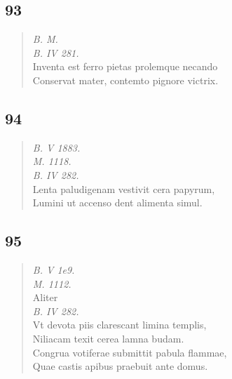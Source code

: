 \documentclass[11pt, a4paper]{report}
\begin{document}
            \subsection*{93}
      \begin{verse}
      \textit{B. M.} \\ \textit{B. IV 281.} \\ Inventa est ferro pietas prolemque necando \\ Conservat mater, contemto pignore victrix. \\ 
      \end{verse}
  
            \subsection*{94}
      \begin{verse}
      \textit{B. V 1883.} \\ \textit{M. 1118.} \\ \textit{B. IV 282.} \\ Lenta paludigenam vestivit cera papyrum, \\ Lumini ut accenso dent alimenta simul. \\ 
      \end{verse}
  
            \subsection*{95}
      \begin{verse}
      \textit{B. V 1e9.} \\ \textit{M. 1112.} \\ Aliter \\ \textit{B. IV 282.} \\ Vt devota piis clarescant limina templis, \\ Niliacam texit cerea lamna budam. \\ Congrua votiferae submittit pabula flammae, \\ Quae castis apibus praebuit ante domus. \\ 
      \end{verse}
  
\end{document}
